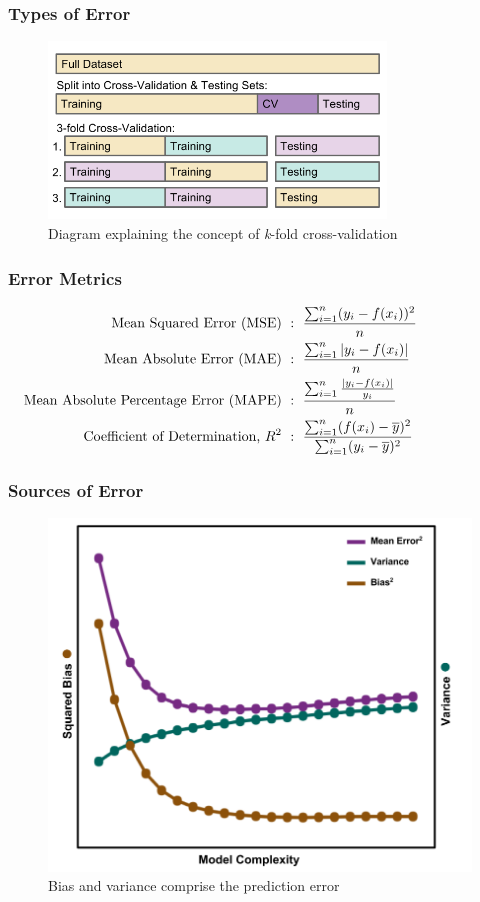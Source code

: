 
\begin{frame}
  \frametitle{Types of Error}
  \begin{figure}[h!]
    \centering
    \includegraphics[width=0.8\textwidth]{./figures/cverror.png}
    \caption{Diagram explaining the concept of \textit{k}-fold cross-validation}
  \end{figure}
\end{frame}

\begin{frame}
  \frametitle{Error Metrics}
  \begin{align*}
    \text{Mean Squared Error (MSE)}\  &:\ \frac{\sum_{i=1}^{n} (y_i - f(x_i))^2}{n} \hspace{2.0cm}\\
    \text{Mean Absolute Error (MAE)}\ &:\ \frac{\sum_{i=1}^{n} |y_i - f(x_i)|}{n} \hspace{2.0cm}\\
    \text{Mean Absolute Percentage Error (MAPE)}\ &:\ \frac{\sum_{i=1}^{n} \frac{|y_i - f(x_i)|}{y_i}}{n} \hspace{2.0cm}\\
    \text{Coefficient of Determination, $R^2$}\ &:\ \frac{\sum_{i=1}^{n} (f(x_i) - \overline{y})^2}{\sum_{i=1}^{n} (y_i - \overline{y})^2} \hspace{2.0cm}
  \end{align*}
\end{frame}

\begin{frame}
  \frametitle{Sources of Error}
  \begin{figure}[h!]
    \centering
    \includegraphics[height=0.7\textheight]{./figures/BVtradeoff.png}
    \caption{Bias and variance comprise the prediction error}
  \end{figure}
\end{frame}
